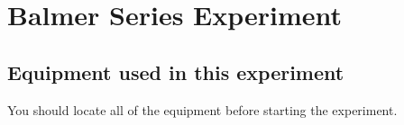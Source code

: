 \documentclass{../lab}
\begin{document}


\section{Balmer Series Experiment}

\subsection{Equipment used in this experiment}

You should locate all of the equipment before starting the experiment.
\end{document}
